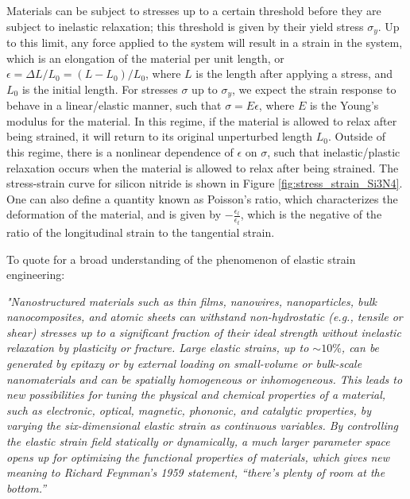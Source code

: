 \documentclass[%
 reprint,
nofootinbib,
 amsmath,amssymb,
 aps,
]{revtex4-2}
\begin{document}
Materials can be subject to stresses up to a certain threshold before they are subject to inelastic relaxation; this threshold is given by their yield stress $\sigma_y$. Up to this limit, any force applied to the system will result in a strain in the system, which is an elongation of the material per unit length, or $\epsilon = \Delta L / L_0 = (L-L_0)/L_0$, where $L$ is the length after applying a stress, and $L_0$ is the initial length. For stresses $\sigma$ up to $\sigma_y$, we expect the strain response to behave in a linear/elastic manner, such that $\sigma = E \epsilon$, where $E$ is the Young's modulus for the material. In this regime, if the material is allowed to relax after being strained, it will return to its original unperturbed length $L_0$. Outside of this regime, there is a nonlinear dependence of $\epsilon$ on $\sigma$, such that inelastic/plastic relaxation occurs when the material is allowed to relax after being strained. The stress-strain curve for silicon nitride is shown in Figure \ref{fig:stress_strain_Si3N4}. One can also define a quantity known as Poisson's ratio, which characterizes the deformation of the material, and is given by $-\frac{\epsilon_l}{\epsilon_t}$, which is the negative of the ratio of the longitudinal strain to the tangential strain.
\newline

To quote \cite{elastic_strain_engineering} for a broad understanding of the phenomenon of elastic strain engineering:
\newline

\textit{"Nanostructured materials such as thin films, nanowires, nanoparticles,
bulk nanocomposites, and atomic sheets can withstand non-hydrostatic (e.g., tensile or shear) stresses up to a significant fraction of their ideal strength without inelastic relaxation by plasticity or fracture. Large elastic strains, up to $\sim 10\%$, can be generated by epitaxy or by external loading on small-volume or bulk-scale nanomaterials and can be spatially homogeneous or inhomogeneous. This leads to new possibilities for tuning the physical and chemical properties of a material, such as electronic, optical, magnetic, phononic, and catalytic properties, by varying the six-dimensional elastic strain as continuous variables. By controlling the elastic strain field statically or dynamically, a much larger parameter space opens up for optimizing the functional properties of materials, which gives new meaning to Richard Feynman’s 1959 statement, “there’s plenty of room at the bottom.”}
\newline
\end{document}
